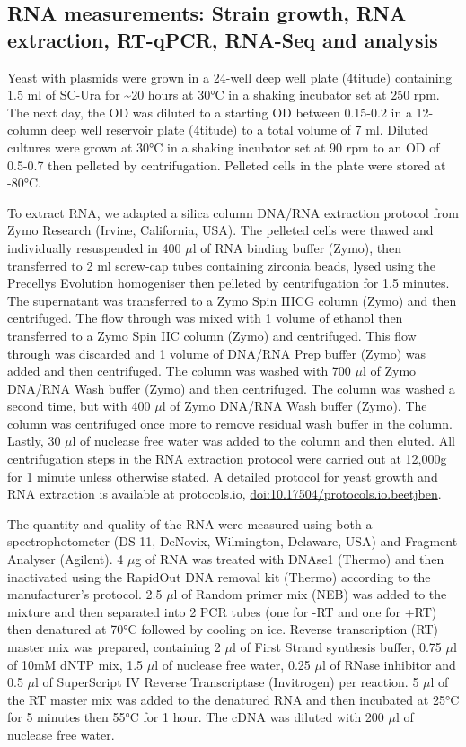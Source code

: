 \documentclass[../main.tex]{subfiles}
\begin{document}
\subsection{RNA measurements: Strain growth, RNA extraction, RT-qPCR, RNA-Seq and analysis}

Yeast with plasmids were grown in a 24-well deep well plate (4titude) containing 1.5 ml of SC-Ura for \textasciitilde20 hours at 30°C in a shaking incubator set at 250 rpm.
The next day, the OD was diluted to a starting OD between 0.15-0.2 in a 12-column deep well reservoir plate (4titude) to a total volume of 7 ml.
Diluted cultures were grown at 30°C in a shaking incubator set at 90 rpm to an OD of 0.5-0.7 then pelleted by centrifugation.
Pelleted cells in the plate were stored at -80°C.

To extract RNA, we adapted a silica column DNA/RNA extraction protocol from Zymo Research (Irvine, California, USA).
The pelleted cells were thawed and individually resuspended in 400 \(\mu\)l of RNA binding buffer (Zymo), then transferred to 2 ml screw-cap tubes containing zirconia beads, lysed using the Precellys Evolution homogeniser then pelleted by centrifugation for 1.5 minutes.
The supernatant was transferred to a Zymo Spin IIICG column (Zymo) and then centrifuged. The flow through was mixed with 1 volume of ethanol then transferred to a Zymo Spin IIC column (Zymo) and centrifuged.
This flow through was discarded and 1 volume of DNA/RNA Prep buffer (Zymo) was added and then centrifuged.
The column was washed with 700 \(\mu\)l of Zymo DNA/RNA Wash buffer (Zymo) and then centrifuged.
The column was washed a second time, but with 400 \(\mu\)l of Zymo DNA/RNA Wash buffer (Zymo).
The column was centrifuged once more to remove residual wash buffer in the column. Lastly, 30 \(\mu\)l of nuclease free water was added to the column and then eluted.
All centrifugation steps in the RNA extraction protocol were carried out at 12,000g for 1 minute unless otherwise stated.
A detailed protocol for yeast growth and RNA extraction is available at protocols.io, \href{https://dx.doi.org/10.17504/protocols.io.beetjben}{doi:10.17504/protocols.io.beetjben}.

The quantity and quality of the RNA were measured using both a spectrophotometer (DS-11, DeNovix, Wilmington, Delaware, USA) and Fragment Analyser (Agilent).
4 \(\mu\)g of RNA was treated with DNAse1 (Thermo) and then inactivated using the RapidOut DNA removal kit (Thermo) according to the manufacturer's protocol.
2.5 \(\mu\)l of Random primer mix (NEB) was added to the mixture and then separated into 2 PCR tubes (one for -RT and one for +RT) then denatured at 70°C followed by cooling on ice.
Reverse transcription (RT) master mix was prepared, containing 2 \(\mu\)l of First Strand synthesis buffer, 0.75 \(\mu\)l of 10mM dNTP mix, 1.5 \(\mu\)l of nuclease free water, 0.25 \(\mu\)l of RNase inhibitor and 0.5 \(\mu\)l of SuperScript IV Reverse Transcriptase (Invitrogen) per reaction.
5 \(\mu\)l of the RT master mix was added to the denatured RNA and then incubated at 25°C for 5 minutes then 55°C for 1 hour. The cDNA was diluted with 200 \(\mu\)l of nuclease free water.
\end{document}
